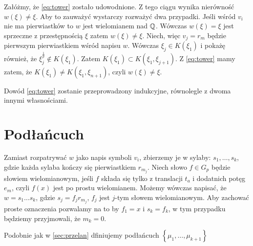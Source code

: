 Załóżmy, że \ref{eq:tower} zostało udowodnione. Z tego ciągu wynika nierówność
$w\left(\xi\right) \neq \xi$. Aby to zauważyć wystarczy rozważyć dwa przypadki.
Jeśli wśród $v_i$ nie ma pierwiastków to $w$ jest wielomianem nad $\mathbb{Q}$. Wówczas
$w(\xi) = \xi$ jest sprzeczne z przestępnością $\xi$ zatem $w(\xi) \neq \xi$.
Niech, więc $v_j = r_m$ będzie pierwszym pierwiastkiem wśród napisu $w$. Wówczas
$\xi_j \in K\left(\xi_1\right)$ i pokażę również, że $\xi_{j}^{\frac{1}{p}} \not
\in K(\xi_1)$. Zatem $K\left(\xi_1\right) \subset K\left(\xi_1,
\xi_{j+1}\right)$. Z \ref{eq:tower} mamy zatem, że $K\left(\xi_1\right) \neq
  K\left(\xi_1, \xi_{n+1}\right)$, czyli $w(\xi) \neq \xi$.

Dowód \ref{eq:tower} zostanie przeprowadzony indukcyjne, równolegle z dwoma
innymi własnościami.

\section{Podłańcuch}

Zamiast rozpatrywać $w$ jako napis symboli $v_i$, zbierzemy je w sylaby: $s_1,
\ldots, s_k$, gdzie każda sylaba kończy się pierwiastkiem $r_{m_j}$. Niech słowo
$f \in G_p$ będzie słowiem wielomianowym, jeśli $f$ składa się tylko z
translacji $t_a$ i dodatnich potęg $e_m$, czyli $f(x)$ jest po prostu
wielomianem. Możemy wówczas napisać, że $w = s_1\ldots s_k$, gdzie $s_j =
f_jr_{m_j}$, $f_j$ jest $j$-tym słowem wielomianowym. Aby zachować proste
oznaczenia pozwalamy na to by $f_1 = x$  i $s_k = f_k$, w tym przypadku będziemy
przyjmowali, że $m_k = 0$. 

Podobnie jak w 
\ref{sec:przelan} dfiniujemy podłańcuch $\left\{\mu_1, \ldots, \mu_{k+1}\right\}$
